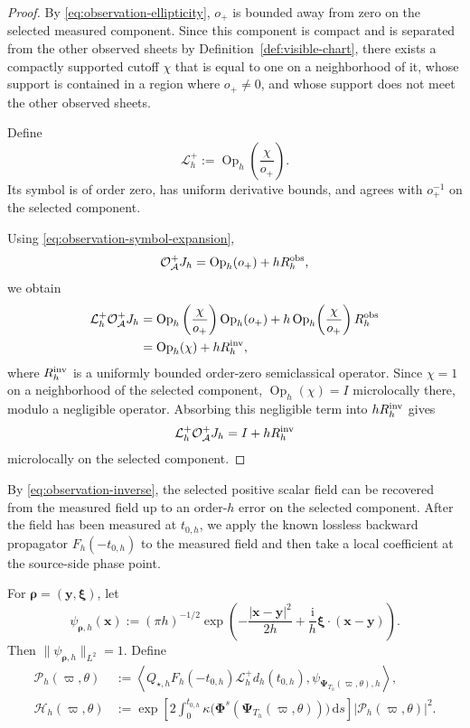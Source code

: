 \documentclass[11pt,reqno]{amsart}
\newcommand{\ii}{\mathrm{i}}
\newcommand{\dd}{\,\mathrm{d}}
\newcommand{\Op}{\operatorname{Op}}
\numberwithin{equation}{section}
\begin{document}
\begin{proof}
By \eqref{eq:observation-ellipticity}, $o_+$ is bounded away from zero on the selected measured component. Since this component is compact and is separated from the other observed sheets by Definition~\ref{def:visible-chart}, there exists a compactly supported cutoff $\chi$ that is equal to one on a neighborhood of it, whose support is contained in a region where $o_+\neq0$, and whose support does not meet the other observed sheets.

Define
$$
    \mathcal L_h^+:=\Op_h\left(\frac{\chi}{o_+}\right).
$$
Its symbol is of order zero, has uniform derivative bounds, and agrees with $o_+^{-1}$ on the selected component.

Using \eqref{eq:observation-symbol-expansion},
$$
    \mathcal O_{\mathcal A}^+J_h =\Op_h(o_+)+hR_h^{\rm obs},
$$
we obtain
$$
\begin{aligned}
    \mathcal L_h^+\mathcal O_{\mathcal A}^+J_h &= \Op_h\left(\frac{\chi}{o_+}\right)\Op_h(o_+)+h\Op_h\!\left(\frac{\chi}{o_+}\right)R_h^{\rm obs} \\
    &=\Op_h(\chi)+hR_h^{\rm inv},
\end{aligned}
$$
where \(R_h^{\rm inv}\) is a uniformly bounded order-zero semiclassical operator. Since \(\chi=1\) on a neighborhood of the selected component, \(\Op_h(\chi)=I\) microlocally there, modulo a negligible operator. Absorbing this negligible term into \(hR_h^{\rm inv}\) gives
$$
    \mathcal L_h^+\mathcal O_{\mathcal A}^+J_h=I+hR_h^{\rm inv}
$$
microlocally on the selected component.
\end{proof}

By \eqref{eq:observation-inverse}, the selected positive scalar field can be recovered from the measured field up to an order-$h$ error on the selected component. After the field has been measured at $t_{0,h}$, we apply the known lossless backward propagator $F_h(-t_{0,h})$ to the measured field and then take a local coefficient at the source-side phase point.

For $\bm\rho=(\bm y,\bm\xi)$, let
\begin{equation*}
 \psi_{\bm\rho,h}(\bm x):=(\pi h)^{-1/2}
 \exp\left(-\frac{|\bm x-\bm y|^2}{2h}
 +\frac{\ii}{h}\bm\xi\cdot(\bm x-\bm y)\right).
\end{equation*}
Then $\|\psi_{\bm\rho,h}\|_{L^2}=1$. Define
\begin{equation}\label{eq:measured-coefficient}
 \begin{aligned}
 \mathscr P_h(\varpi,\theta)
 &:=\left\langle
 Q_{\star,h}F_h(-t_{0,h})\mathcal L_h^+d_h(t_{0,h}),
 \psi_{\bm\Psi_{T_h}(\varpi,\theta),h}\right\rangle,\\
 \mathcal H_h(\varpi,\theta)
 &:=\exp\left[2\int_0^{t_{0,h}}
 \kappa\bigl(\bm\Phi^s(\bm\Psi_{T_h}(\varpi,\theta))\bigr)\dd s\right]
 |\mathscr P_h(\varpi,\theta)|^2.
 \end{aligned}
\end{equation}
\end{document}
